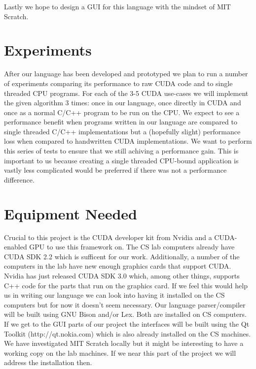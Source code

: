 \documentclass{article}
\begin{document}
Lastly we hope to design a GUI for this language with the mindset of MIT Scratch. 

\section{Experiments}
After our language has been developed and prototyped we plan to run a number of experiments comparing its performance to raw CUDA code and to single threaded CPU programs. For each of the 3-5 CUDA use-cases we will implement the given algorithm 3 times: once in our language, once directly in CUDA and once as a normal C/C++ program to be run on the CPU. We expect to see a performance benefit when programs written in our language are compared to single threaded C/C++ implementations but a (hopefully slight) performance loss when compared to handwritten CUDA implementations. We want to perform this series of tests to ensure that we still achiving a performance gain. This is important to us because creating a single threaded CPU-bound application is vastly less complicated would be preferred if there was not a performance difference.

\section{Equipment Needed}
Crucial to this project is the CUDA developer kit from Nvidia and a CUDA-enabled GPU to use this framework on. The CS lab computers already have CUDA SDK 2.2 which is sufficent for our work. Additionally, a number of the computers in the lab have new enough graphics cards that support CUDA. Nvidia has just released CUDA SDK 3.0 which, among other things, supports C++ code for the parts that run on the graphics card. If we feel this would help us in writing our language we can look into having it installed on the CS computers but for now it doesn't seem necessary. Our language parser/compiler will be built using GNU Bison and/or Lex. Both are installed on CS computers. If we get to the GUI parts of our project the interfaces will be built using the Qt Toolkit (http://qt.nokia.com) which is also already installed on the CS machines. We have investigated MIT Scratch locally but it might be interesting to have a working copy on the lab machines. If we near this part of the project we will address the installation then.
\end{document}
